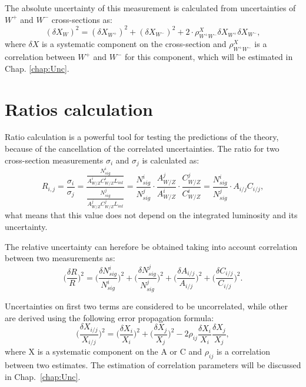 The absolute uncertainty of this measurement is calculated from uncertainties of $W^{+}$ and $W^{-}$ cross-sections as:
\begin{equation}
(\delta X_{W})^2 = (\delta X_{W^{+}})^2+(\delta X_{W^{-}})^2 + 2\cdot \rho^{X}_{W^+W^-}\delta X_{W^{+}}\delta X_{W^{-}},
\end{equation}
where $\delta X$ is a systematic component on the cross-section and $\rho^{X}_{W^+W^-}$ is a correlation between $W^{+}$ and $W^{-}$ for this component, which will be estimated in Chap. \ref{chap:Unc}. 
\section{Ratios calculation}\label{sec:Rat}

Ratio calculation is a powerful tool for testing the predictions of the theory, because of the cancellation of the correlated uncertainties. The ratio for two cross-section measurements $\sigma_i$ and $\sigma_j$ is calculated as:
\begin{equation}
R_{i,j}=\frac{\sigma_i}{\sigma_j}=\frac{\frac{N^{i}_{sig}}{A^{i}_{W/Z}C^{i}_{W/Z}L_{int}}}{ \frac{N^{j}_{sig}}{A^{j}_{W/Z}C^{j}_{W/Z}L_{int}}}
=\frac{N^{i}_{sig}}{N^{j}_{sig}}\cdot \frac{A^{j}_{W/Z}}{A^{i}_{W/Z}} \cdot \frac{C^{j}_{W/Z}}{C^{i}_{W/Z}}=\frac{N^{i}_{sig}}{N^{j}_{sig}}\cdot A_{i/j} C_{i/j},
\end{equation}
what means that this value does not depend on the integrated luminosity and its uncertainty.

The relative uncertainty can herefore be obtained taking into account correlation between two measurements as:
\begin{equation}
\Big(\frac{\delta R }{R}\Big)^2=\Big(\frac{\delta N^{i}_{sig}}{N^{i}_{sig}}\Big)^2+\Big(\frac{\delta N^{j}_{sig}}{N^{j}_{sig}}\Big)^2+\Big(\frac{\delta A_{i/j}}{A_{i/j}}\Big)^2+\Big(\frac{\delta C_{i/j}}{C_{i/j}}\Big)^2.
\end{equation}

Uncertainties on first two terms are considered to be uncorrelated, while other are derived using the following error propagation formula:
\begin{equation}
\Big(\frac{\delta X_{i/j} }{X_{i/j}}\Big)^2= \Big(\frac{\delta X_{i} }{X_{i}}\Big)^2+\Big(\frac{\delta X_{j} }{X_{j}}\Big)^2-2\rho_{ij}\frac{\delta X_{i}}{X_{i}}\frac{\delta X_{j}}{X_{j}},
\end{equation}
where X is a systematic component on the A or C and $\rho_{ij}$ is a correlation between two estimates. The estimation of correlation parameters will be discussed in Chap.~\ref{chap:Unc}.


